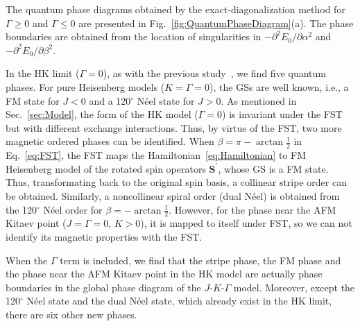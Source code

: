 \documentclass[aps,prb,reprint,amsfonts,amsmath,amssymb,showpacs,groupedaddress,superscriptaddress]{revtex4-1}
\begin{document}
The quantum phase diagrams obtained by the exact-diagonalization method for $\Gamma \geq 0$ and $\Gamma \leq 0$ are presented in Fig.~\ref{fig:QuantumPhaseDiagram}(a). The phase boundaries are obtained from the location of singularities in $-\partial^2E_0/\partial\alpha^2$ and $-\partial^2E_0/\partial\beta^2$.

In the HK limit ($\Gamma=0$), as with the previous study~\cite{KaiLi2015}, we find five quantum phases. For pure Heisenberg models ($K=\Gamma=0$), the GSs are well known, i.e., a FM state for $J<0$ and a 120$^\circ$ N\'{e}el state for $J>0$. As mentioned in Sec.~\ref{sec:Model}, the form of the HK model ($\Gamma=0$) is invariant under the FST~\cite{PhysRevB.89.014414} but with different exchange interactions. Thus, by virtue of the FST, two more magnetic ordered phases can be identified. When $\beta=\pi - \arctan\frac{1}{2}$ in Eq.~\eqref{eq:FST}, the FST maps the Hamiltonian~\eqref{eq:Hamiltonian} to FM Heisenberg model of the rotated spin operators $\bm{S}^{\prime}$, whose GS is a FM state. Thus, transformating back to the original spin basis, a collinear stripe order can be obtained. Similarly, a noncollinear spiral order (dual N\'{e}el) is obtained from the 120$^\circ$ N\'{e}el order for $\beta=-\arctan\frac{1}{2}$. However, for the phase near the AFM Kitaev point ($J=\Gamma=0$, $K>0$), it is mapped to itself under FST, so we can not identify its magnetic properties with the FST.

When the $\Gamma$ term is included, we find that the stripe phase, the FM phase and the phase near the AFM Kitaev point in the HK model are actually phase boundaries in the global phase diagram of the $J$-$K$-$\Gamma$ model. Moreover, except the 120$^\circ$ N\'{e}el state and the dual N\'{e}el state, which already exist in the HK limit, there are six other new phases.
\end{document}
